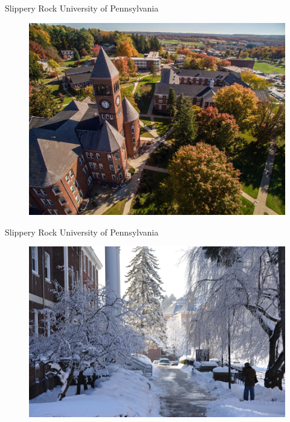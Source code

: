 \documentclass{beamer}
\begin{document}
\begin{frame}{Slippery Rock University of Pennsylvania}
\begin{figure}
	\includegraphics[width=\linewidth]{img/sru2.jpg}
\end{figure}
\end{frame}

\begin{frame}{Slippery Rock University of Pennsylvania}
\begin{figure}
	\includegraphics[width=\linewidth]{img/sru4.jpg}
\end{figure}
\end{frame}
\end{document}
